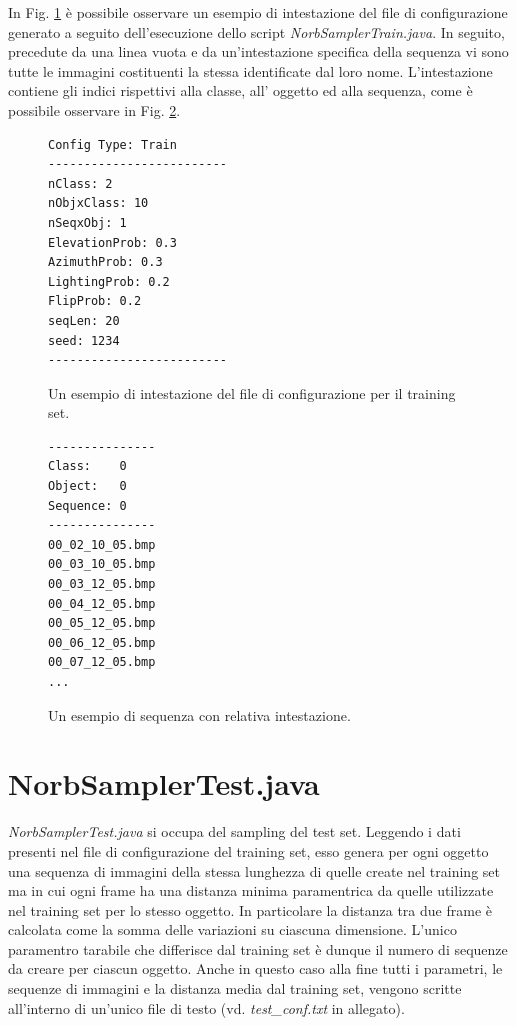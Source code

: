 \documentclass[paper=a4, fontsize=11pt]{scrartcl} %
\numberwithin{equation}{section} %
\numberwithin{figure}{section} %
\numberwithin{table}{section} %
\begin{document}
In Fig. \ref{img:trainheader} è possibile osservare un esempio di intestazione del file di configurazione generato a seguito dell'esecuzione dello script \emph{NorbSamplerTrain.java}.
In seguito, precedute da una linea vuota e da un'intestazione specifica della sequenza vi sono tutte le immagini costituenti la stessa identificate dal loro nome.
L'intestazione contiene gli indici rispettivi alla classe, all' oggetto ed alla sequenza, come è possibile osservare in Fig.
 \ref{img:seqheader}.

\begin{figure}[H]
\label{img:trainheader}
\centering
\begin{BVerbatim}
Config Type: Train
-------------------------
nClass: 2
nObjxClass: 10
nSeqxObj: 1
ElevationProb: 0.3
AzimuthProb: 0.3
LightingProb: 0.2
FlipProb: 0.2
seqLen: 20
seed: 1234
-------------------------
\end{BVerbatim}
\caption{Un esempio di intestazione del file di configurazione per il training set.}
\end{figure}

\begin{figure}[H]
\label{img:seqheader}
\centering
\begin{BVerbatim}
---------------
Class:    0
Object:   0
Sequence: 0
---------------
00_02_10_05.bmp
00_03_10_05.bmp
00_03_12_05.bmp
00_04_12_05.bmp
00_05_12_05.bmp
00_06_12_05.bmp
00_07_12_05.bmp
...
\end{BVerbatim}
\caption{Un esempio di sequenza con relativa intestazione.}
\end{figure}

\section{NorbSamplerTest.java}
\emph{NorbSamplerTest.java} si occupa del sampling del test set. Leggendo i dati presenti nel file di configurazione del training set, esso genera per ogni oggetto una sequenza di immagini della stessa lunghezza di quelle create nel training set ma in cui ogni frame ha una distanza minima paramentrica da quelle utilizzate nel training set per lo stesso oggetto. In particolare la distanza tra due frame è calcolata come la somma delle variazioni su ciascuna dimensione. L'unico paramentro tarabile che differisce dal training set è dunque il numero di sequenze da creare per ciascun oggetto. Anche in questo caso alla fine tutti i parametri, le sequenze di immagini e la distanza media dal training set, vengono scritte all'interno di un'unico file di testo (vd. \emph{test\_conf.txt} in allegato). 
\end{document}
